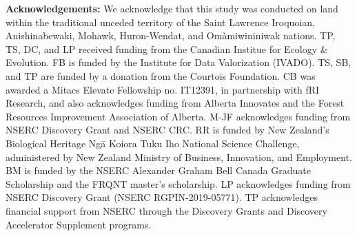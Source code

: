 \documentclass[10pt,oneside]{article}
\begin{document}
\textbf{Acknowledgements:} We acknowledge that this study was conducted
on land within the traditional unceded territory of the Saint Lawrence
Iroquoian, Anishinabewaki, Mohawk, Huron-Wendat, and Omàmiwininiwak
nations. TP, TS, DC, and LP received funding from the Canadian Institue
for Ecology \& Evolution. FB is funded by the Institute for Data
Valorization (IVADO). TS, SB, and TP are funded by a donation from the
Courtois Foundation. CB was awarded a Mitacs Elevate Fellowship no.
IT12391, in partnership with fRI Research, and also acknowledges funding
from Alberta Innovates and the Forest Resources Improvement Association
of Alberta. M-JF acknowledges funding from NSERC Discovery Grant and
NSERC CRC. RR is funded by New Zealand's Biological Heritage Ngā Koiora
Tuku Iho National Science Challenge, administered by New Zealand
Ministry of Business, Innovation, and Employment. BM is funded by the
NSERC Alexander Graham Bell Canada Graduate Scholarship and the FRQNT
master's scholarship. LP acknowledges funding from NSERC Discovery Grant
(NSERC RGPIN-2019-05771). TP acknowledges financial support from NSERC
through the Discovery Grants and Discovery Accelerator Supplement
programs.
\end{document}
